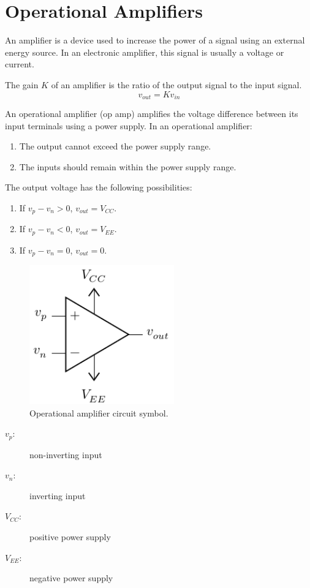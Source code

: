 \documentclass{article}
\begin{document}
\section{Operational Amplifiers}
\begin{definition}[Amplifier]
    An amplifier is a device used to increase the power of a signal
    using an external energy source. In an electronic amplifier, this
    signal is usually a voltage or current.
\end{definition}
\begin{definition}[Gain]
    The gain \(K\) of an amplifier is the ratio of the output signal to the input signal.
    \begin{equation*}
        v_{out} = K v_{in}
    \end{equation*}
\end{definition}
\begin{definition}
    An operational amplifier (op amp) amplifies the voltage difference between its input terminals
    using a power supply. In an operational amplifier:
    \begin{enumerate}
        \item The output cannot exceed the power supply range.
        \item The inputs should remain within the power supply range.
    \end{enumerate}
    The output voltage has the following possibilities:
    \begin{enumerate}
        \item If \(v_p - v_n > 0\), \(v_{out} = V_{CC}\).
        \item If \(v_p - v_n < 0\), \(v_{out} = V_{EE}\).
        \item If \(v_p - v_n = 0\), \(v_{out} = 0\).
    \end{enumerate}
    \begin{figure}[H]
        \centering
        \includegraphics[height = 6cm, keepaspectratio = true]{figures/operational_amplifier.pdf}
        \caption{Operational amplifier circuit symbol.}
    \end{figure}
    \begin{description}
        \item[\(v_p\):] non-inverting input
        \item[\(v_n\):] inverting input
        \item[\(V_{CC}\):] positive power supply
        \item[\(V_{EE}\):] negative power supply
    \end{description}
\end{definition}
\end{document}
